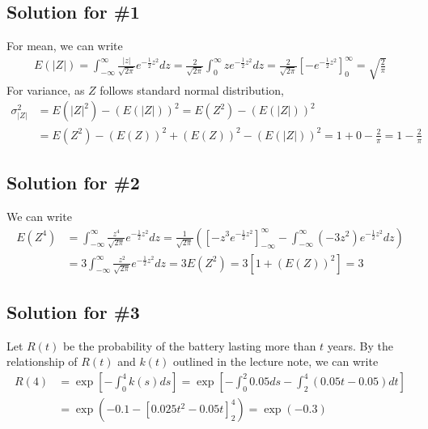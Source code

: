 \documentclass{scrartcl}
\begin{document}
\subsection{Solution for \#1}
For mean, we can write
\begin{align*}
  E(|Z|)
  = \int^\infty_{-\infty} \frac{|z|}{\sqrt{2\pi}} e^{-\frac{1}{2}z^2} dz
  = \frac{2}{\sqrt{2\pi}} \int^\infty_0 z e^{-\frac{1}{2}z^2} dz
  = \frac{2}{\sqrt{2\pi}} \left[ -e^{-\frac{1}{2}z^2} \right]^\infty_0
  = \sqrt{\frac{2}{\pi}}
\end{align*}
For variance, as \(Z\) follows standard normal distribution,
\begin{align*}
  \sigma^2_|Z|
  &= E(|Z|^2) - (E(|Z|))^2
  = E(Z^2) - (E(|Z|))^2 \\
  &= E(Z^2) - (E(Z))^2 + (E(Z))^2 - (E(|Z|))^2
  = 1 + 0 - \frac{2}{\pi}
  = 1 - \frac{2}{\pi}
\end{align*}

\subsection{Solution for \#2}
We can write
\begin{align*}
  E(Z^4)
  &= \int^\infty_{-\infty} \frac{z^4}{\sqrt{2\pi}} e^{-\frac{1}{2}z^2} dz
  = \frac{1}{\sqrt{2\pi}}
    \left( \left[ -z^3 e^{-\frac{1}{2}z^2} \right]^\infty_{-\infty}
    - \int^\infty_{-\infty} (-3z^2) e^{-\frac{1}{2}z^2} dz \right) \\
  &= 3 \int^\infty_{-\infty} \frac{z^2}{\sqrt{2\pi}} e^{-\frac{1}{2}z^2} dz
  = 3E(Z^2)
  = 3[1 + (E(Z))^2]
  = 3
\end{align*}

\subsection{Solution for \#3}
Let \(R(t)\) be the probability of the battery lasting more than \(t\) years.
By the relationship of \(R(t)\) and \(k(t)\) outlined in the lecture note, we
can write
\begin{align*}
  R(4)
  &= \exp \left[ -\int^4_0 k(s) ds \right]
  = \exp \left[ -\int^2_0 0.05 ds - \int^4_2 (0.05t - 0.05) dt \right] \\
  &= \exp \left( -0.1 - \left[ 0.025t^2 - 0.05t \right]^4_2 \right)
  = \exp (-0.3)
\end{align*}
\end{document}
